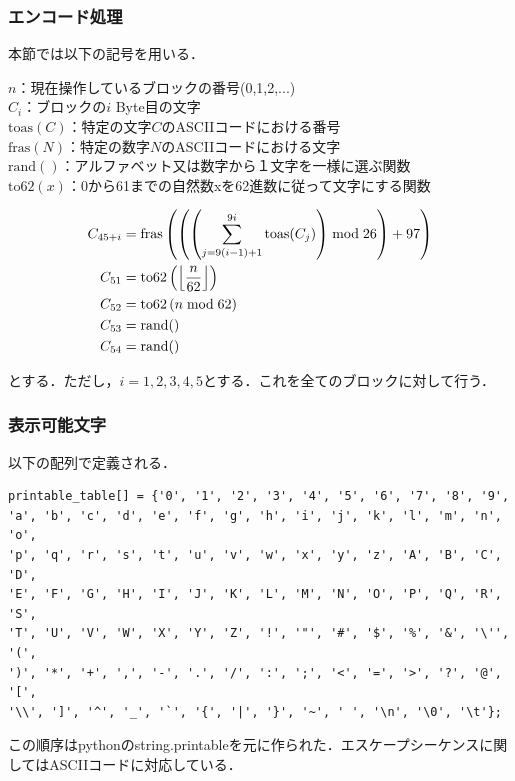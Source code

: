 \documentclass{jsarticle}
\begin{document}
\subsubsection{エンコード処理}
本節では以下の記号を用いる．

\(n\)：現在操作しているブロックの番号(0,1,2,...)\\
\(C_i\)：ブロックの\(i\) Byte目の文字\\
\(\mathrm{toas}(C)\)：特定の文字\(C\)のASCIIコードにおける番号\\
\(\mathrm{fras}(N)\)：特定の数字\(N\)のASCIIコードにおける文字\\
\(\mathrm{rand}()\)：アルファベット又は数字から１文字を一様に選ぶ関数\\
\(\mathrm{to62}(x)\)：0から61までの自然数xを62進数に従って文字にする関数

\begin{align}
C_{45+i} &= \mathrm{fras}\left(\left(\left(\sum_{j=9(i-1)+1}^{9i}{\mathrm{toas}(C_j)}\right)\bmod 26\right)+97\right) \notag\\
C_{51} &= \mathrm{to62}\left (\left \lfloor\frac{n}{62}\right \rfloor \right) \notag\\
C_{52} &= \mathrm{to62}\left ( n \bmod 62 \right) \notag\\
C_{53} &= \mathrm{rand}() \notag\\
C_{54} &= \mathrm{rand}() \notag\\
\end{align}

とする．ただし，\(i=1,2,3,4,5\)とする．これを全てのブロックに対して行う．

\subsubsection{表示可能文字}
以下の配列で定義される．
\begin{verbatim}
printable_table[] = {'0', '1', '2', '3', '4', '5', '6', '7', '8', '9', 
'a', 'b', 'c', 'd', 'e', 'f', 'g', 'h', 'i', 'j', 'k', 'l', 'm', 'n', 'o',
'p', 'q', 'r', 's', 't', 'u', 'v', 'w', 'x', 'y', 'z', 'A', 'B', 'C', 'D',
'E', 'F', 'G', 'H', 'I', 'J', 'K', 'L', 'M', 'N', 'O', 'P', 'Q', 'R', 'S',
'T', 'U', 'V', 'W', 'X', 'Y', 'Z', '!', '"', '#', '$', '%', '&', '\'', '(',
')', '*', '+', ',', '-', '.', '/', ':', ';', '<', '=', '>', '?', '@', '[', 
'\\', ']', '^', '_', '`', '{', '|', '}', '~', ' ', '\n', '\0', '\t'};
\end{verbatim}

この順序はpythonのstring.printableを元に作られた．エスケープシーケンスに関してはASCIIコードに対応している．
\end{document}
